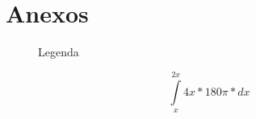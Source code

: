 \section{Anexos}
\lipsum[1]
\begin{center}
	\begin{figure}[h]
		\caption{Legenda}
		\label{fig:placeholder.jpg}
	\end{figure}
	\begin{equation}
	\int\limits_{x}^{2x} 4x*180\pi*dx
	\end{equation}
\end{center}